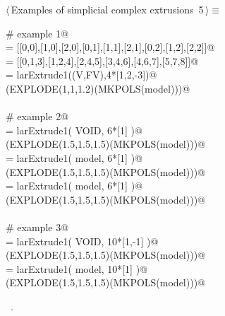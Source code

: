 \documentclass[11pt,oneside]{article}	%
\begin{document}
\begin{flushleft} \small \label{scrap5}
\protect{}$\langle\,$Examples of simplicial complex extrusions\nobreak\ {\footnotesize 5}$\,\rangle\equiv$
\vspace{-1ex}
\begin{list}{}{} \item
\mbox{}\verb@# example 1@\\
\mbox{}\verb@V = [[0,0],[1,0],[2,0],[0,1],[1,1],[2,1],[0,2],[1,2],[2,2]]@\\
\mbox{}\verb@FV = [[0,1,3],[1,2,4],[2,4,5],[3,4,6],[4,6,7],[5,7,8]]@\\
\mbox{}\verb@model = larExtrude1((V,FV),4*[1,2,-3])@\\
\mbox{}\verb@VIEW(EXPLODE(1,1,1.2)(MKPOLS(model)))@\\
\mbox{}\verb@@\\
\mbox{}\verb@# example 2@\\
\mbox{}\verb@model = larExtrude1( VOID, 6*[1] )@\\
\mbox{}\verb@VIEW(EXPLODE(1.5,1.5,1.5)(MKPOLS(model)))@\\
\mbox{}\verb@model = larExtrude1( model, 6*[1] )@\\
\mbox{}\verb@VIEW(EXPLODE(1.5,1.5,1.5)(MKPOLS(model)))@\\
\mbox{}\verb@model = larExtrude1( model, 6*[1] )@\\
\mbox{}\verb@VIEW(EXPLODE(1.5,1.5,1.5)(MKPOLS(model)))@\\
\mbox{}\verb@@\\
\mbox{}\verb@# example 3@\\
\mbox{}\verb@model = larExtrude1( VOID, 10*[1,-1] )@\\
\mbox{}\verb@VIEW(EXPLODE(1.5,1.5,1.5)(MKPOLS(model)))@\\
\mbox{}\verb@model = larExtrude1( model, 10*[1] )@\\
\mbox{}\verb@VIEW(EXPLODE(1.5,1.5,1.5)(MKPOLS(model)))@\\
\mbox{}\verb@@{\NWsep}
\end{list}
\vspace{-1ex}
\footnotesize\addtolength{\baselineskip}{-1ex}
\begin{list}{}{\setlength{\itemsep}{-\parsep}\setlength{\itemindent}{-\leftmargin}}
\item \NWtxtMacroRefIn\ .
\end{list}
\end{flushleft}
\end{document}
